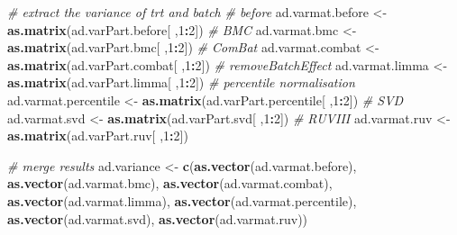 \documentclass[]{book}
\newenvironment{Shaded}{\begin{snugshade}}{\end{snugshade}}
\newcommand{\KeywordTok}[1]{\textcolor[rgb]{0.13,0.29,0.53}{\textbf{#1}}}
\newcommand{\DecValTok}[1]{\textcolor[rgb]{0.00,0.00,0.81}{#1}}
\newcommand{\StringTok}[1]{\textcolor[rgb]{0.31,0.60,0.02}{#1}}
\newcommand{\CommentTok}[1]{\textcolor[rgb]{0.56,0.35,0.01}{\textit{#1}}}
\newcommand{\OperatorTok}[1]{\textcolor[rgb]{0.81,0.36,0.00}{\textbf{#1}}}
\newcommand{\NormalTok}[1]{#1}
\begin{document}
\begin{Shaded}
\begin{Highlighting}[]
\CommentTok{# extract the variance of trt and batch}
\CommentTok{# before}
\NormalTok{ad.varmat.before <-}\StringTok{ }\KeywordTok{as.matrix}\NormalTok{(ad.varPart.before[ ,}\DecValTok{1}\OperatorTok{:}\DecValTok{2}\NormalTok{])}
\CommentTok{# BMC}
\NormalTok{ad.varmat.bmc <-}\StringTok{ }\KeywordTok{as.matrix}\NormalTok{(ad.varPart.bmc[ ,}\DecValTok{1}\OperatorTok{:}\DecValTok{2}\NormalTok{])}
\CommentTok{# ComBat}
\NormalTok{ad.varmat.combat <-}\StringTok{ }\KeywordTok{as.matrix}\NormalTok{(ad.varPart.combat[ ,}\DecValTok{1}\OperatorTok{:}\DecValTok{2}\NormalTok{])}
\CommentTok{# removeBatchEffect}
\NormalTok{ad.varmat.limma <-}\StringTok{ }\KeywordTok{as.matrix}\NormalTok{(ad.varPart.limma[ ,}\DecValTok{1}\OperatorTok{:}\DecValTok{2}\NormalTok{])}
\CommentTok{# percentile normalisation}
\NormalTok{ad.varmat.percentile <-}\StringTok{ }\KeywordTok{as.matrix}\NormalTok{(ad.varPart.percentile[ ,}\DecValTok{1}\OperatorTok{:}\DecValTok{2}\NormalTok{])}
\CommentTok{# SVD}
\NormalTok{ad.varmat.svd <-}\StringTok{ }\KeywordTok{as.matrix}\NormalTok{(ad.varPart.svd[ ,}\DecValTok{1}\OperatorTok{:}\DecValTok{2}\NormalTok{])}
\CommentTok{# RUVIII}
\NormalTok{ad.varmat.ruv <-}\StringTok{ }\KeywordTok{as.matrix}\NormalTok{(ad.varPart.ruv[ ,}\DecValTok{1}\OperatorTok{:}\DecValTok{2}\NormalTok{])}


\CommentTok{# merge results}
\NormalTok{ad.variance <-}\StringTok{ }\KeywordTok{c}\NormalTok{(}\KeywordTok{as.vector}\NormalTok{(ad.varmat.before), }\KeywordTok{as.vector}\NormalTok{(ad.varmat.bmc),}
                 \KeywordTok{as.vector}\NormalTok{(ad.varmat.combat), }\KeywordTok{as.vector}\NormalTok{(ad.varmat.limma),}
                 \KeywordTok{as.vector}\NormalTok{(ad.varmat.percentile), }\KeywordTok{as.vector}\NormalTok{(ad.varmat.svd), }
                 \KeywordTok{as.vector}\NormalTok{(ad.varmat.ruv))}


\end{Highlighting}
\end{Shaded}
\end{document}
